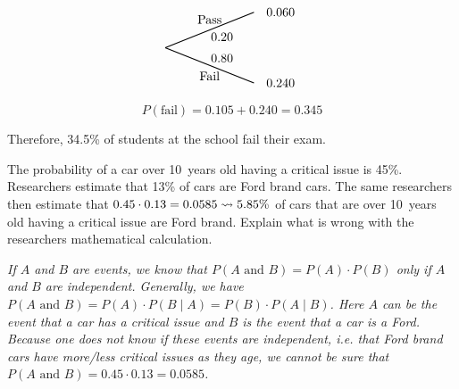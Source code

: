 \documentclass[12pt,letterpaper]{exam}
\begin{document}
\begin{questions}
\[\begin{tikzpicture}[scale= 1.0]
	\node at (3.75,-0.7) {\SecondUpLabel};
	\node at (3.75,-2.3) {\SecondDownLabel};
	\node at (4.1,-1.2) {\DownUp};
	\node at (4.1,-1.8) {\DownDown};
	\node at (5.75,-0.5) {\third};	
	\node at (5.75,-2.5) {\fourth};	
	\draw[thick] (2.5,-1.5) -- (5,-0.5);
	\draw[thick] (2.5,-1.5) -- (5,-2.5);
	\end{tikzpicture}
	\] \pspace
	
	\[
	P(\text{fail})= 0.105 + 0.240= 0.345
	\] \pspace

Therefore, 34.5\% of students at the school fail their exam. 



\newpage
\question[10] The probability of a car over 10~years old having a critical issue is 45\%. Researchers estimate that 13\% of cars are Ford brand cars. The same researchers then estimate that $0.45 \cdot 0.13= 0.0585 \rightsquigarrow 5.85\%$ of cars that are over 10~years old having a critical issue are Ford brand. Explain what is wrong with the researchers mathematical calculation. \pspace

{\itshape
If $A$ and $B$ are events, we know that $P(A \text{ and } B)= P(A) \cdot P(B)$ only if $A$ and $B$ are independent. Generally, we have $P(A \text{ and } B)= P(A) \cdot P(B \;|\; A)= P(B) \cdot P(A \;|\; B)$. Here $A$ can be the event that a car has a critical issue and $B$ is the event that a car is a Ford. Because one does not know if these events are independent, i.e. that Ford brand cars have more/less critical issues as they age, we cannot be sure that $P(A \text{ and } B)= 0.45 \cdot 0.13= 0.0585$. 
}


\end{questions}
\end{document}

